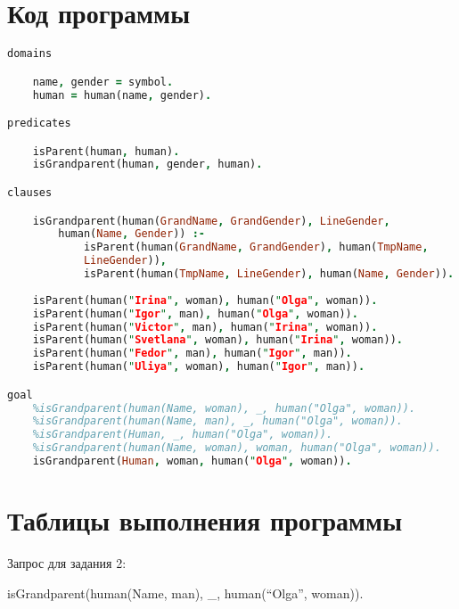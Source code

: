 \documentclass[14pt,a4paper]{scrreprt}
\begin{document}
\section{Код программы}

\begin{lstlisting}[language=Prolog]
domains

	name, gender = symbol.
	human = human(name, gender).

predicates

	isParent(human, human).
	isGrandparent(human, gender, human).

clauses

	isGrandparent(human(GrandName, GrandGender), LineGender, 
		human(Name, Gender)) :- 
			isParent(human(GrandName, GrandGender), human(TmpName, 
			LineGender)), 
			isParent(human(TmpName, LineGender), human(Name, Gender)).
	
	isParent(human("Irina", woman), human("Olga", woman)).
	isParent(human("Igor", man), human("Olga", woman)).
	isParent(human("Victor", man), human("Irina", woman)).
	isParent(human("Svetlana", woman), human("Irina", woman)).
	isParent(human("Fedor", man), human("Igor", man)).
	isParent(human("Uliya", woman), human("Igor", man)).

goal
	%isGrandparent(human(Name, woman), _, human("Olga", woman)).
	%isGrandparent(human(Name, man), _, human("Olga", woman)).
	%isGrandparent(Human, _, human("Olga", woman)).
	%isGrandparent(human(Name, woman), woman, human("Olga", woman)).
	isGrandparent(Human, woman, human("Olga", woman)).
\end{lstlisting}

\newpage
\section{Таблицы выполнения программы}

Запрос для задания 2:

isGrandparent(human(Name, man), \_, human(``Olga'', woman)).
\end{document}
